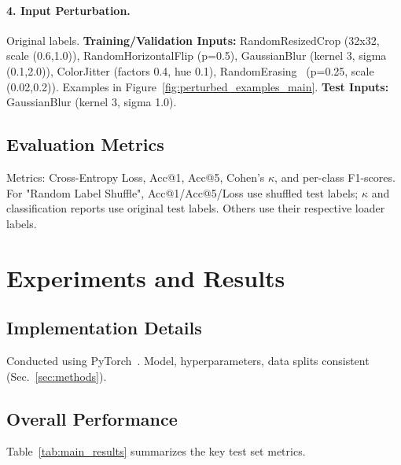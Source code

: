 \documentclass[10pt,twocolumn,letterpaper]{article}
\begin{document}
\paragraph{4. Input Perturbation.}
Original labels.
\textbf{Training/Validation Inputs:} RandomResizedCrop (32x32, scale (0.6,1.0)), RandomHorizontalFlip (p=0.5), GaussianBlur (kernel 3, sigma (0.1,2.0)), ColorJitter (factors 0.4, hue 0.1), RandomErasing~\cite{DBLP:conf/aaai/Zhong0KL020} (p=0.25, scale (0.02,0.2)). Examples in Figure~\ref{fig:perturbed_examples_main}.
\textbf{Test Inputs:} GaussianBlur (kernel 3, sigma 1.0).

\subsection{Evaluation Metrics}
Metrics: Cross-Entropy Loss, Acc@1, Acc@5, Cohen's $\kappa$, and per-class F1-scores.
For "Random Label Shuffle", Acc@1/Acc@5/Loss use shuffled test labels; $\kappa$ and classification reports use original test labels. Others use their respective loader labels.

\section{Experiments and Results} %
\label{sec:experiments_results}

\subsection{Implementation Details}
Conducted using PyTorch~\cite{DBLP:conf/nips/PaszkeGMLBCKLGA19}. Model, hyperparameters, data splits consistent (Sec.~\ref{sec:methods}).

\subsection{Overall Performance}
Table~\ref{tab:main_results} summarizes the key test set metrics.
\end{document}
